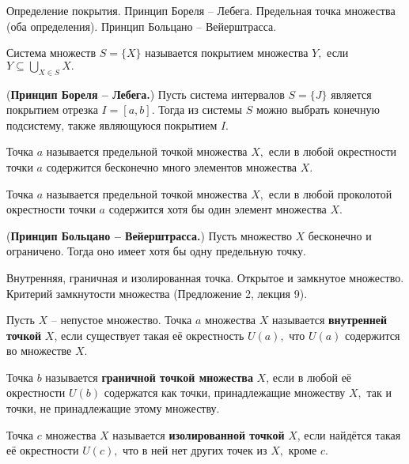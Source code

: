 \newpage
\begin{problem}
Определение покрытия. Принцип Бореля – Лебега. Предельная точка множества (оба
определения). Принцип Больцано – Вейерштрасса.
\end{problem}
\begin{definition}
	Система множеств $S=\{X\}$ называется
	покрытием множества $Y,$ если
	$Y\subseteq\bigcup\limits_{X\in S}X.$
\end{definition}

\begin{theorem} (\textbf{Принцип Бореля -- Лебега.})
	Пусть система интервалов $S=\{J\}$ является покрытием
	отрезка $I=[a, b].$ Тогда из системы $S$ можно
	выбрать конечную подсистему, также являющуюся
	покрытием $I.$
\end{theorem}

\begin{definition}
	Точка $a$ называется предельной
	точкой множества $X,$ если в любой
	окрестности точки $a$ содержится
	бесконечно много элементов множества
	$X.$
\end{definition}

\begin{definition}
	Точка $a$ называется предельной
	точкой множества $X,$ если в любой
	проколотой окрестности точки $a$ содержится
	хотя бы один элемент множества
	$X.$
\end{definition}

\begin{theorem} (\textbf{Принцип Больцано -- Вейерштрасса.})
	Пусть множество $X$ бесконечно и ограничено. Тогда оно
	имеет хотя бы одну предельную точку.
\end{theorem}


\newpage
\begin{problem}
Внутренняя, граничная и изолированная точка. Открытое и замкнутое множество.
Критерий замкнутости множества (Предложение 2, лекция 9).
\end{problem}

\begin{definition}
	Пусть $X$ -- непустое множество. Точка $a$
	множества $X$ называется \textbf{внутренней
		точкой} $X$,
	если существует такая её окрестность $U(a),$
	что $U(a)$ содержится во множестве $X.$

	Точка $b$ называется
	\textbf{граничной точкой множества} $X$,
	если в любой её окрестности $U(b)$ содержатся как
	точки, принадлежащие множеству
	$X,$ так и точки, не
	принадлежащие этому множеству.

	Точка $c$ множества $X$ называется
	\textbf{изолированной точкой} $X$,
	если найдётся такая её окрестности $U(c),$
	что в ней нет других точек из $X,$ кроме $c.$
\end{definition}

